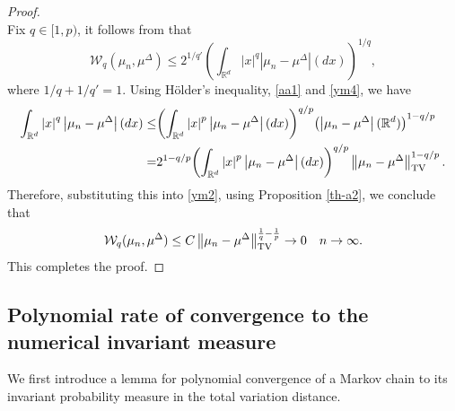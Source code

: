 \documentclass[preprint,12pt,compress]{elsarticle}
\begin{document}
\begin{proof}
\begin{equation}
\end{equation}
Fix $q \in [1, p)$, it follows from \cite[Theorem 6.15]{villani2009optimal} that 
\begin{equation}  \label{ym2}
	{\mathcal{W}_q}({\mu _n},{\mu ^\Delta }) \le {2^{{1}/{q'}}}{\left( {\int_{{\mathbb{R}^d}} {{{\left| x \right|}^q}\left| {{\mu _n} - {\mu ^\Delta }} \right|(dx)} } \right)^{{1}/{q}}}, 
\end{equation}
where $1/q + 1/q' = 1$.
Using H\"older's inequality, \eqref{aa1} and \eqref{ym4}, we have
\begin{equation*}  
\begin{split}
	\int_{{\mathbb{R}^d}} {{{\left| x \right|}^q}\left| {{\mu _n} - {\mu ^\Delta }} \right|(dx)}  \le& {\left( {\int_{{\mathbb{R}^d}} {{{\left| x \right|}^p}\left| {{\mu _n} - {\mu ^\Delta }} \right|(dx)} } \right)^{q/p}}{\left( {\left| {{\mu _n} - {\mu ^\Delta }} \right|({\mathbb{R}^d})} \right)^{1 - q/p}} \\
	=& {2^{1 - q/p}}{\left( {\int_{{\mathbb{R}^d}} {{{\left| x \right|}^p}\left| {{\mu _n} - {\mu ^\Delta }} \right|(dx)} } \right)^{q/p}}\left\| {\mu_n  - \mu^\Delta } \right\|_{\rm TV}^{1 - q/p} .
\end{split}
\end{equation*}
Therefore, substituting this into \eqref{ym2}, using Proposition \ref{th-a2}, we conclude that
\begin{equation}  \label{ym6}
	{\mathcal{W}_q}({\mu _n},{\mu ^\Delta }) \le C\left\| {{\mu _n} - {\mu ^\Delta }} \right\|_{{\rm TV}}^{\frac{1}{q} - \frac{1}{p}} \to 0 \quad n \to \infty.
\end{equation}
This completes the proof.
\end{proof}


\subsection{Polynomial rate of convergence to the numerical invariant measure}

We first introduce a lemma for polynomial convergence of a Markov chain to its invariant probability measure in the total variation distance.
\end{document}
